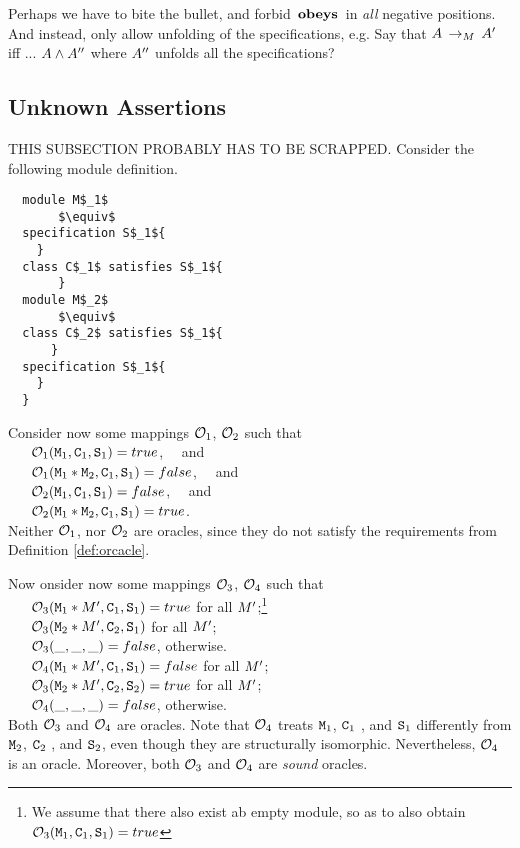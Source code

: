 Perhaps we have to bite the bullet, and forbid $\,\textbf{\textrm{obeys}}\,$ in {\em all} negative positions. And instead, only allow unfolding of the 
specifications, e.g. Say that $A\, \rightarrow_{M}\, A'$ iff ... $A \wedge A''$ where $A''$ unfolds all the specifications?

\subsection{Unknown Assertions}
THIS SUBSECTION PROBABLY HAS TO BE SCRAPPED.
\label{problems:undefinedAssert}
Consider the following module definition.

 \begin{lstlisting}
  module M$_1$
       $\equiv$
  specification S$_1${
    }
  class C$_1$ satisfies S$_1${
       }
  module M$_2$
       $\equiv$
  class C$_2$ satisfies S$_1${
      }
  specification S$_1${
    }
  }
\end{lstlisting}

\noindent
Consider now some mappings ${\cal O}_1$,  ${\cal O}_2$ such that\\
  $~ \ \ \ \ \  $  ${\cal O}_1({\textrm{\ttfamily{M}}}_1,{\textrm{\ttfamily{C}}}_1,{\textrm{\ttfamily{S}}}_1)=true$, \ \ and \\  $~ \ \ \ \ \  $  ${\cal O}_1({\textrm{\ttfamily{M}}}_1*{\textrm{\ttfamily{M}}}_2,{\textrm{\ttfamily{C}}}_1,{\textrm{\ttfamily{S}}}_1)=false$, \ \
 and\\
 $~ \ \ \ \ \  $  ${\cal O}_2({\textrm{\ttfamily{M}}}_1,{\textrm{\ttfamily{C}}}_1,{\textrm{\ttfamily{S}}}_1)=false$, \ \  and\\   $~ \ \ \ \ \  $  ${\cal O}_2({\textrm{\ttfamily{M}}}_1*{\textrm{\ttfamily{M}}}_2,{\textrm{\ttfamily{C}}}_1,{\textrm{\ttfamily{S}}}_1)=true$.\\
Neither ${\cal O}_1$, nor ${\cal O}_2$ are oracles, since they do not satisfy the requirements from Definition \ref{def:orcacle}.

Now onsider now some mappings ${\cal O}_3$,  ${\cal O}_4$ such that\\
 $~ \ \ \ \ \  $  ${\cal O}_3({\textrm{\ttfamily{M}}}_1*M',{\textrm{\ttfamily{C}}}_1,{\textrm{\ttfamily{S}}}_1)=true$  for all $M'$;\footnote{We assume that there also exist ab empty module, so as to also obtain ${\cal O}_3({\textrm{\ttfamily{M}}}_1,{\textrm{\ttfamily{C}}}_1,{\textrm{\ttfamily{S}}}_1)=true$}\\
$~ \ \ \ \ \ $  ${\cal O}_3({\textrm{\ttfamily{M}}}_2*M',{\textrm{\ttfamily{C}}}_2,{\textrm{\ttfamily{S}}}_1)$ for all $M'$;\\
 $~ \ \ \ \ \ $ ${\cal O}_3(\_,\_,\_)=false$, otherwise.
\\
$~ \ \ \ \ \ $ ${\cal O}_4({\textrm{\ttfamily{M}}}_1*M',{\textrm{\ttfamily{C}}}_1,{\textrm{\ttfamily{S}}}_1)=false$  for all $M'$;
\\ $~ \ \ \ \ \ $ ${\cal O}_3({\textrm{\ttfamily{M}}}_2*M',{\textrm{\ttfamily{C}}}_2,{\textrm{\ttfamily{S}}}_2)=true$ for all $M'$;
\\$~ \ \ \ \ \ $  ${\cal O}_4(\_,\_,\_)=false$, otherwise.
\\
Both ${\cal O}_3$ and ${\cal O}_4$ are oracles.
Note that  ${\cal O}_4$  treats ${\textrm{\ttfamily{M}}}_1$, ${\textrm{\ttfamily{C}}}_1$ , and ${\textrm{\ttfamily{S}}}_1$ differently from
${\textrm{\ttfamily{M}}}_2$, ${\textrm{\ttfamily{C}}}_2$ , and ${\textrm{\ttfamily{S}}}_2$, even though they are structurally isomorphic. Nevertheless, ${\cal O}_4$ is
an oracle.  Moreover, both ${\cal O}_3$ and ${\cal O}_4$ are {\em sound} oracles.

